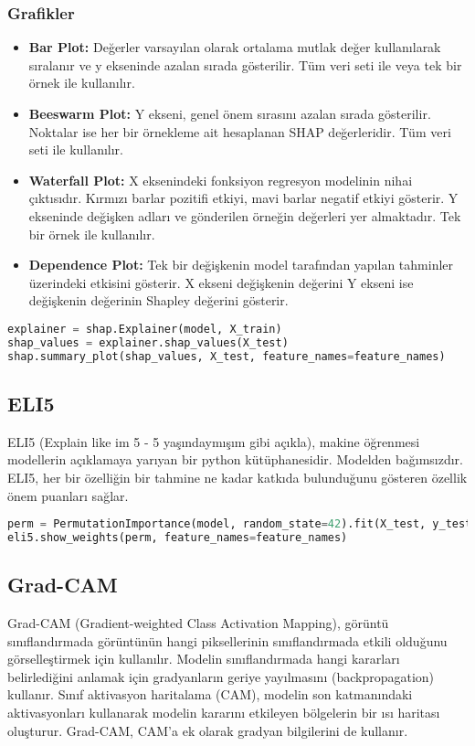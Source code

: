 \subsubsection{Grafikler}

\begin{itemize}
    \item \textbf{Bar Plot:} Değerler varsayılan olarak ortalama mutlak değer kullanılarak sıralanır ve y ekseninde azalan sırada gösterilir. Tüm veri seti ile veya tek bir örnek ile kullanılır.
    \item \textbf{Beeswarm Plot:} Y ekseni, genel önem sırasını azalan sırada gösterilir. Noktalar ise her bir örnekleme ait hesaplanan SHAP değerleridir. Tüm veri seti ile kullanılır.
    \item \textbf{Waterfall Plot:} X eksenindeki fonksiyon regresyon modelinin nihai çıktısıdır. Kırmızı barlar pozitifi etkiyi, mavi barlar negatif etkiyi gösterir. Y ekseninde değişken adları ve gönderilen örneğin değerleri yer almaktadır. Tek bir örnek ile kullanılır.
    \item \textbf{Dependence Plot:} Tek bir değişkenin model tarafından yapılan tahminler üzerindeki etkisini gösterir. X ekseni değişkenin değerini Y ekseni ise değişkenin değerinin Shapley değerini gösterir.
\end{itemize}

\begin{lstlisting}[language=Python]
explainer = shap.Explainer(model, X_train)
shap_values = explainer.shap_values(X_test)
shap.summary_plot(shap_values, X_test, feature_names=feature_names)
\end{lstlisting}

\subsection{ELI5}
ELI5 (Explain like im 5 - 5 yaşındaymışım gibi açıkla), makine öğrenmesi modellerin açıklamaya yarıyan bir python kütüphanesidir. Modelden bağımsızdır. ELI5, her bir özelliğin bir tahmine ne kadar katkıda bulunduğunu gösteren özellik önem puanları sağlar.

\begin{lstlisting}[language=Python]
perm = PermutationImportance(model, random_state=42).fit(X_test, y_test)
eli5.show_weights(perm, feature_names=feature_names)
\end{lstlisting}

\subsection{Grad-CAM}
Grad-CAM (Gradient-weighted Class Activation Mapping), görüntü sınıflandırmada görüntünün hangi piksellerinin sınıflandırmada etkili olduğunu görselleştirmek için kullanılır. Modelin sınıflandırmada hangi kararları belirlediğini anlamak için gradyanların geriye yayılmasını (backpropagation) kullanır. Sınıf aktivasyon haritalama (CAM), modelin son katmanındaki aktivasyonları kullanarak modelin kararını etkileyen bölgelerin bir ısı haritası oluşturur. Grad-CAM, CAM'a ek olarak gradyan bilgilerini de kullanır.

